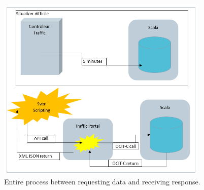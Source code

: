 \documentclass[12pt]{report}
\begin{document}
	\begin{center}
		\begin{figure}
			\centering
			\includegraphics[width=0.9\textwidth]{images/TLCProcess.png}
			\caption{Entire process between requesting data and receiving response.}
			\label{TLCProcess}
		\end{figure}
	\end{center}
	
\end{document}
